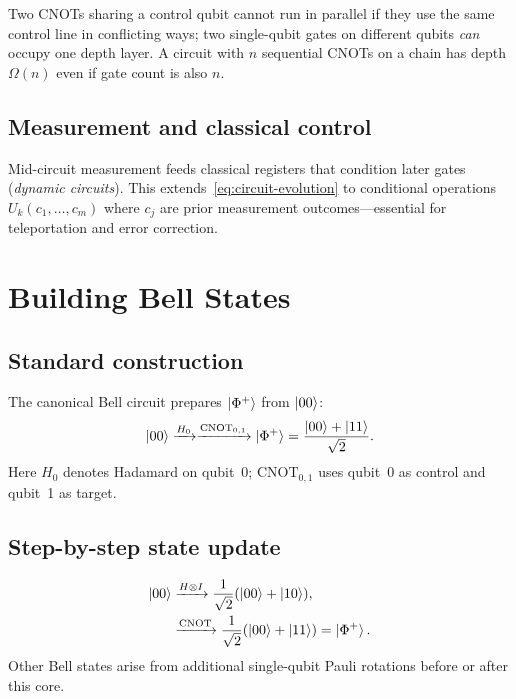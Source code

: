 \begin{example}
Two CNOTs sharing a control qubit cannot run in parallel if they use the same control line in conflicting ways; two single-qubit gates on different qubits \emph{can} occupy one depth layer. A circuit with $n$ sequential CNOTs on a chain has depth $\Omega(n)$ even if gate count is also $n$.
\end{example}

\subsection{Measurement and classical control}

Mid-circuit measurement feeds classical registers that condition later gates (\emph{dynamic circuits}). This extends~\eqref{eq:circuit-evolution} to conditional operations $U_k(c_1,\ldots,c_m)$ where $c_j$ are prior measurement outcomes---essential for teleportation and error correction.

\section{Building Bell States}
\label{sec:bell-circuit}

\subsection{Standard construction}

The canonical Bell circuit prepares $\ket{\Phi^+}$ from $\ket{00}$:
\begin{equation}
\ket{00}\xrightarrow{H_0}\xrightarrow{\mathrm{CNOT}_{0,1}}\ket{\Phi^+}
=\frac{\ket{00}+\ket{11}}{\sqrt{2}}.
\label{eq:bell-circuit}
\end{equation}
Here $H_0$ denotes Hadamard on qubit~0; $\mathrm{CNOT}_{0,1}$ uses qubit~0 as control and qubit~1 as target.

\subsection{Step-by-step state update}

\begin{align*}
\ket{00} &\xrightarrow{H\otimes I} \frac{1}{\sqrt{2}}(\ket{00}+\ket{10}), \\
&\xrightarrow{\mathrm{CNOT}} \frac{1}{\sqrt{2}}(\ket{00}+\ket{11})=\ket{\Phi^+}.
\end{align*}
Other Bell states arise from additional single-qubit Pauli rotations before or after this core.

